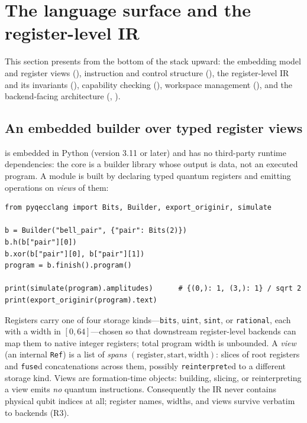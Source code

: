 \section{The language surface and the register-level IR}
\label{sec:language}

This section presents \pqlang{} from the bottom of the stack upward: the
embedding model and register views (), instruction and
control structure (), the register-level IR and its
invariants (), capability checking
(), workspace management (), and
the backend-facing architecture (, ).

\subsection{An embedded builder over typed register views}
\label{sec:builder}

\pqlang{} is embedded in Python (version 3.11 or later) and has no
third-party runtime dependencies: the core is a builder library whose output
is data, not an executed program.  A module is built by declaring typed
quantum registers and emitting operations on \emph{views} of them:

\begin{lstlisting}[style=pyqpython, caption={A minimal \pqlang{} program (from the doctested tutorial suite).  Register index~0 is the least significant bit; \texttt{fuse} concatenates views across root registers; \texttt{simulate} is the dependency-free reference executor.}, label={lst:bell}]
from pyqecclang import Bits, Builder, export_originir, simulate

b = Builder("bell_pair", {"pair": Bits(2)})
b.h(b["pair"][0])
b.xor(b["pair"][0], b["pair"][1])
program = b.finish().program()

print(simulate(program).amplitudes)      # {(0,): 1, (3,): 1} / sqrt 2
print(export_originir(program).text)
\end{lstlisting}

Registers carry one of four storage kinds---\texttt{bits}, \texttt{uint},
\texttt{sint}, or \texttt{rational}, each with a width in $[0,64]$---chosen
so that downstream register-level backends can map them to native integer
registers; total program width is unbounded.  A \emph{view} (an internal
\texttt{Ref}) is a list of \emph{spans} $(\text{register}, \text{start},
\text{width})$: slices of root registers and \texttt{fuse}d concatenations
across them, possibly \texttt{reinterpret}ed to a different storage kind.
Views are formation-time objects: building, slicing, or reinterpreting a view
emits \emph{no} quantum instructions.  Consequently the IR never contains
physical qubit indices at all; register names, widths, and views survive
verbatim to backends (R3).

